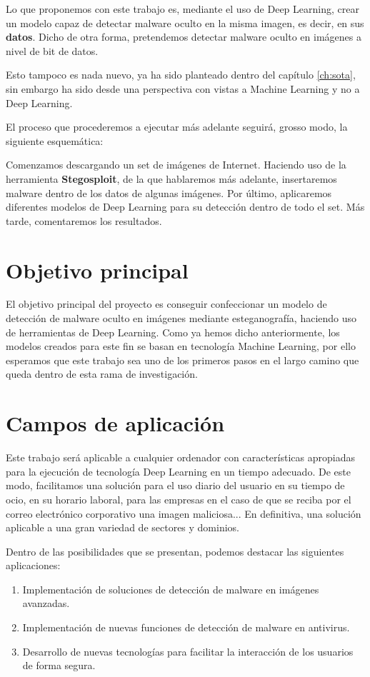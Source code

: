 Lo que proponemos con este trabajo es, mediante el uso de Deep Learning, crear un modelo capaz de detectar malware oculto en la misma imagen, es decir, en sus \textbf{datos}. Dicho de otra forma, pretendemos detectar malware oculto en imágenes a nivel de bit de datos.

Esto tampoco es nada nuevo, ya ha sido planteado dentro del capítulo \ref{ch:sota}, sin embargo ha sido desde una perspectiva con vistas a Machine Learning y no a Deep Learning.

El proceso que procederemos a ejecutar más adelante seguirá, grosso modo, la siguiente esquemática:


Comenzamos descargando un set de imágenes de Internet. Haciendo uso de la herramienta \textbf{Stegosploit}, de la que hablaremos más adelante, insertaremos malware dentro de los datos de algunas imágenes. Por último, aplicaremos diferentes modelos de Deep Learning para su detección dentro de todo el set. Más tarde, comentaremos los resultados.

\section{Objetivo principal}

El objetivo principal del proyecto es conseguir confeccionar un modelo de detección de malware oculto en imágenes mediante esteganografía, haciendo uso de herramientas de Deep Learning. Como ya hemos dicho anteriormente, los modelos creados para este fin se basan en tecnología Machine Learning, por ello esperamos que este trabajo sea uno de los primeros pasos en el largo camino que queda dentro de esta rama de investigación.

\section{Campos de aplicación}

Este trabajo será aplicable a cualquier ordenador con características apropiadas para la ejecución de tecnología Deep Learning en un tiempo adecuado. De este modo, facilitamos una solución para el uso diario del usuario en su tiempo de ocio, en su horario laboral, para las empresas en el caso de que se reciba por el correo electrónico corporativo una imagen maliciosa... En definitiva, una solución aplicable a una gran variedad de sectores y dominios. 

Dentro de las posibilidades que se presentan, podemos destacar las siguientes aplicaciones:
\begin{enumerate}
\item Implementación de soluciones de detección de malware en imágenes avanzadas.
\item Implementación de nuevas funciones de detección de malware en antivirus.
\item Desarrollo de nuevas tecnologías para facilitar la interacción de los usuarios de forma segura.
\end{enumerate}

